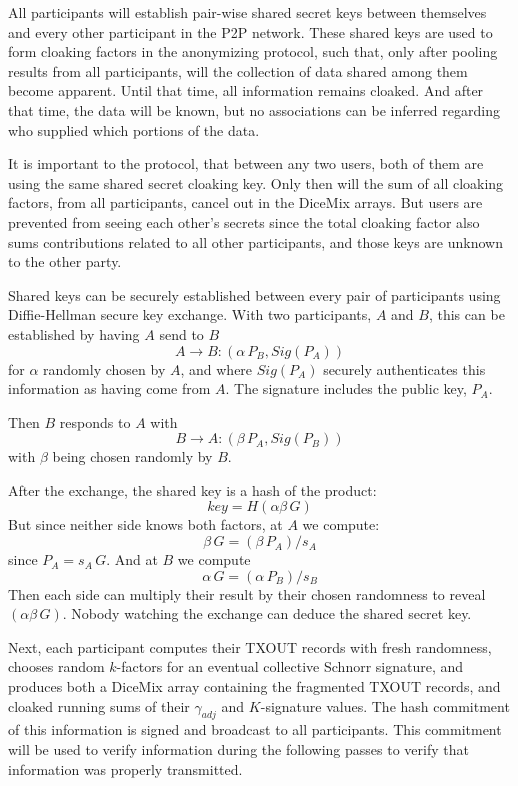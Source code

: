 \documentclass[a4paper, 10pt, conference]{ieeeconf}
\begin{document}
All participants will establish pair-wise shared secret keys between themselves and every other participant in the P2P network. These shared keys are used to form cloaking factors in the anonymizing protocol, such that, only after pooling results from all participants, will the collection of data shared among them become apparent. Until that time, all information remains cloaked. And after that time, the data will be known, but no associations can be inferred regarding who supplied which portions of the data. 

It is important to the protocol, that between any two users, both of them are using the same shared secret cloaking key. Only then will the sum of all cloaking factors, from all participants, cancel out in the DiceMix arrays. But users are prevented from seeing each other's secrets since the total cloaking factor also sums contributions related to all other participants, and those keys are unknown to the other party.

Shared keys can be securely established between every pair of participants using Diffie-Hellman secure key exchange. With two participants, $A$ and $B$, this can be established by having $A$ send to $B$
$$A \rightarrow B: (\alpha \, P_B, \mathit{Sig}(P_A))$$
for $\alpha$ randomly chosen by $A$, and where $\mathit{Sig}(P_A)$ securely authenticates this information as having come from $A$. The signature includes the public key, $P_A$. 

Then $B$ responds to $A$ with
$$B \rightarrow A: (\beta \, P_A, \mathit{Sig}(P_B))$$
with $\beta$ being chosen randomly by $B$. 

After the exchange, the shared key is a hash of the product:
$$key = H(\alpha \beta \, G)$$ 
But since neither side knows both factors, at $A$ we compute:
$$\beta \, G = (\beta \, P_A) / s_A$$
since $P_A = s_A \, G$. And at $B$ we compute
$$\alpha \, G = (\alpha \, P_B) / s_B$$
Then each side can multiply their result by their chosen randomness to reveal $(\alpha \beta \, G)$. Nobody watching the exchange can deduce the shared secret key.

Next, each participant computes their TXOUT records with fresh randomness, chooses random $k$-factors for an eventual collective Schnorr signature, and produces both a DiceMix array containing the fragmented TXOUT records, and cloaked running sums of their $\gamma_{\mathit{adj}}$ and $K$-signature values. The hash commitment of this information is signed and broadcast to all participants. This commitment will be used to verify information during the following passes to verify that information was properly transmitted.
\end{document}
